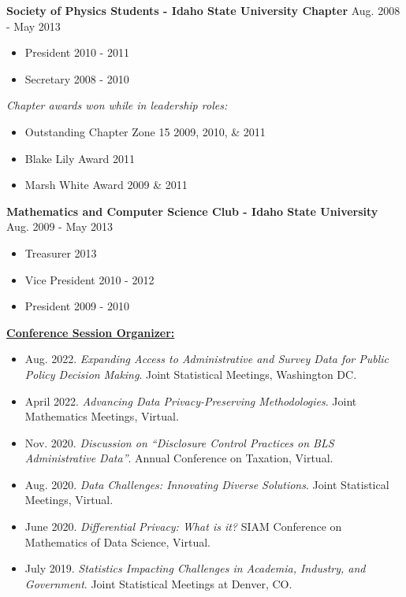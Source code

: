 \leadershipspace
\textbf{Society of Physics Students - Idaho State University Chapter} \hfill Aug. 2008 - May 2013

\begin{itemize}
    \item President \hfill 2010 - 2011
    \item Secretary \hfill 2008 - 2010
\end{itemize}
\textit{Chapter awards won while in leadership roles:}
\begin{itemize}
    \item Outstanding Chapter Zone 15 \hfill 2009, 2010, \& 2011
    \item Blake Lily Award \hfill 2011
    \item Marsh White Award \hfill 2009 \& 2011
\end{itemize}

\leadershipspace
\textbf{Mathematics and Computer Science Club - Idaho State University} \hfill Aug. 2009 - May 2013
\begin{itemize}
    \item Treasurer \hfill 2013
    \item Vice President \hfill 2010 - 2012
    \item President \hfill 2009 - 2010
\end{itemize}

\professionalspace
\underline{\textbf{\large Conference Session Organizer:}}\normalsize

\begin{itemize}\setlength\itemsep{2pt}
    \item Aug. 2022. \textit{Expanding Access to Administrative and Survey Data for Public Policy Decision Making}. Joint Statistical Meetings, Washington DC. 
    \item April 2022. \textit{Advancing Data Privacy-Preserving Methodologies}. Joint Mathematics Meetings, Virtual.  
     \item Nov. 2020. \textit{Discussion on ``Disclosure Control Practices on BLS Administrative Data''}. Annual Conference on Taxation, Virtual.   
    \item Aug. 2020. \textit{Data Challenges: Innovating Diverse Solutions}. Joint Statistical Meetings, Virtual.
    \item June 2020. \textit{Differential Privacy: What is it?} SIAM Conference on Mathematics of Data Science, Virtual.
    \item July 2019. \textit{Statistics Impacting Challenges in Academia, Industry, and Government}. Joint Statistical Meetings at Denver, CO.
\end{itemize}


